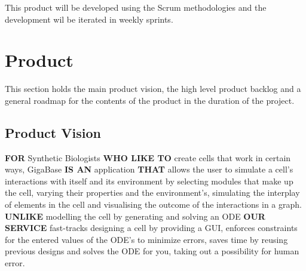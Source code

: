 \documentclass[10pt,a4paper]{report}
\begin{document}
This product will be developed using the Scrum methodologies and the development wil be iterated in weekly sprints.

	\clearpage

	\section{Product}
		This section holds the main product vision, the high level product backlog and a general roadmap for the contents of the product in the duration of the project.
		\subsection{Product Vision}

			\textbf{FOR} Synthetic Biologists \textbf{WHO LIKE TO} create cells that work in certain ways, GigaBase \textbf{IS AN} application \textbf{THAT} allows the user to simulate a cell's interactions with itself and its environment by selecting modules that make up the cell, varying their properties and the environment’s, simulating the interplay of elements in the cell and visualising the outcome of the interactions in a graph. \textbf{UNLIKE} modelling the cell by generating and solving an ODE \textbf{OUR SERVICE} fast-tracks designing a cell by providing a GUI, enforces constraints for the entered values of the ODE's to minimize errors, saves time by reusing previous designs and solves the ODE for you, taking out a possibility for human error.
\end{document}
